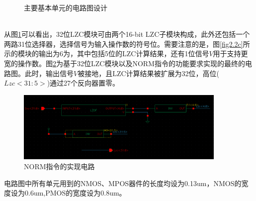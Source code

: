 \begin{figure}[!hbtp]
\centering
{}


\caption{主要基本单元的电路图设计}
\label{fig2.2}
\end{figure}\\
从图\ref{fig2.2}可以看出，32位LZC模块可由两个16-bit LZC子模块构成，此外还包括一个两路31位选择器，选择信号为输入操作数的符号位。需要注意的是，图\ref{fig2.2c}所示的模块的输出为6为，其中包括5位的LZC计算结果，还有1位信号$V$用于支持更宽的操作数。图\ref{fig2.3}为基于32位LZC模块以及NORM指令的功能要求实现的最终的电路图。此时，输出信号$V$被接地，且LZC计算结果被扩展为32位，高位($Lzc<31:5>$)通过27个反向器置零。
\begin{figure}[!hbtp]
\centering
\includegraphics[width=0.9\textwidth]{chapter2/NORM}
\caption{NORM指令的实现电路}
\label{fig2.3}
\end{figure}

电路图中所有单元用到的NMOS、MPOS器件的长度均设为0.13um，NMOS的宽度设为0.6um,PMOS的宽度设为0.8um。

